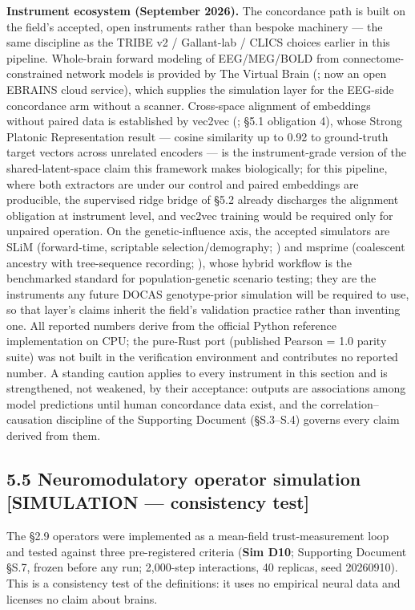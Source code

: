 \documentclass[
]{article}
\begin{document}
\textbf{Instrument ecosystem (September 2026).} The concordance path is
built on the field's accepted, open instruments rather than bespoke
machinery --- the same discipline as the TRIBE v2 / Gallant-lab / CLICS
choices earlier in this pipeline. Whole-brain forward modeling of
EEG/MEG/BOLD from connectome-constrained network models is provided by
The Virtual Brain (; now an open EBRAINS cloud service), which supplies
the simulation layer for the EEG-side concordance arm without a scanner.
Cross-space alignment of embeddings without paired data is established
by vec2vec (; §5.1 obligation 4), whose Strong Platonic Representation
result --- cosine similarity up to 0.92 to ground-truth target vectors
across unrelated encoders --- is the instrument-grade version of the
shared-latent-space claim this framework makes biologically; for this
pipeline, where both extractors are under our control and paired
embeddings are producible, the supervised ridge bridge of §5.2 already
discharges the alignment obligation at instrument level, and vec2vec
training would be required only for unpaired operation. On the
genetic-influence axis, the accepted simulators are SLiM (forward-time,
scriptable selection/demography; ) and msprime (coalescent ancestry with
tree-sequence recording; ), whose hybrid workflow is the benchmarked
standard for population-genetic scenario testing; they are the
instruments any future DOCAS genotype-prior simulation will be required
to use, so that layer's claims inherit the field's validation practice
rather than inventing one. All reported numbers derive from the official
Python reference implementation on CPU; the pure-Rust port (published
Pearson = 1.0 parity suite) was not built in the verification
environment and contributes no reported number. A standing caution
applies to every instrument in this section and is strengthened, not
weakened, by their acceptance: outputs are associations among model
predictions until human concordance data exist, and the
correlation--causation discipline of the Supporting Document (§S.3--S.4)
governs every claim derived from them.

\subsection{5.5 Neuromodulatory operator simulation {[}SIMULATION ---
consistency
test{]}}\label{neuromodulatory-operator-simulation-simulation-consistency-test}

The §2.9 operators were implemented as a mean-field trust-measurement
loop and tested against three pre-registered criteria (\textbf{Sim D10};
Supporting Document §S.7, frozen before any run; 2,000-step
interactions, 40 replicas, seed 20260910). This is a consistency test of
the definitions: it uses no empirical neural data and licenses no claim
about brains.
\end{document}
